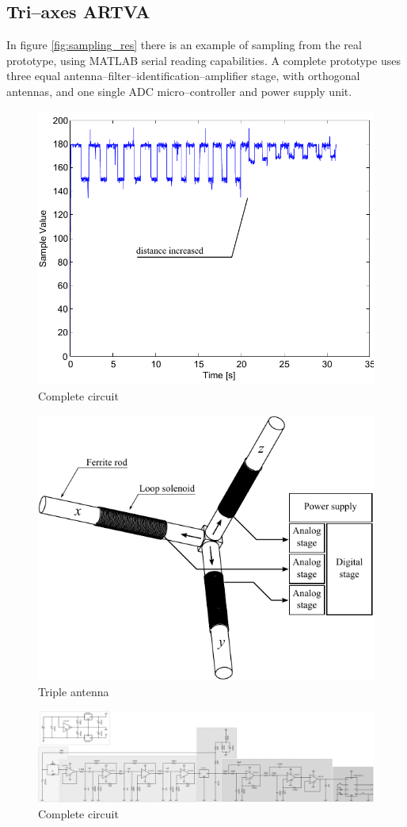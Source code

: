 \subsection{Tri--axes ARTVA}
In figure \ref{fig:sampling_res} there is an example of sampling from the real prototype, using MATLAB serial reading capabilities. A complete prototype uses three equal antenna--filter--identification--amplifier stage, with orthogonal antennas, and one single ADC micro--controller and power supply unit.
\begin{figure}[p]
	\centering
	\includegraphics[scale=0.65]{ch2/img/sampling_result.pdf}
	\caption{Complete circuit}
	\label{fig:samplig_res}
\end{figure}
\begin{figure}[p]
	\centering
	\includegraphics[scale=1]{ch2/img/triplantenna.pdf}
	\caption{Triple antenna}
	\label{fig:trantenna}
\end{figure}
\begin{figure}[p]
	\centering
	\includegraphics[scale=0.25,angle=90]{ch2/img/receiver3.pdf}
	\caption{Complete circuit}
	\label{fig:completecirc}
	\forceversofloat
\end{figure}